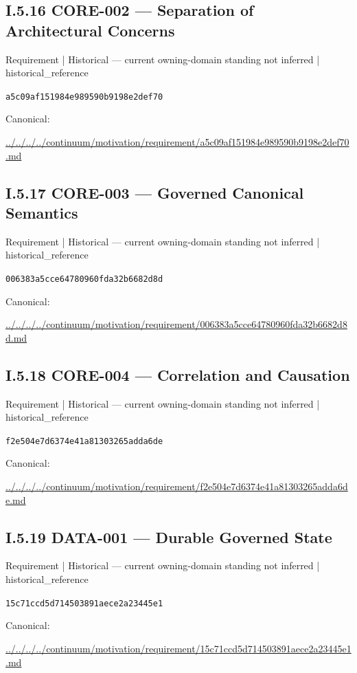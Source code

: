 \documentclass[10pt,a4paper]{article}
\begin{document}
\subsection*{I.5.16 CORE-002 — Separation of Architectural Concerns}
\label{element-a5c09af151984e989590b9198e2def70}
{\small Requirement | Historical — current owning-domain standing not inferred | historical\_reference}\par
\texttt{a5c09af151984e989590b9198e2def70}\par
Canonical: \par
{\footnotesize\url{../../../../continuum/motivation/requirement/a5c09af151984e989590b9198e2def70.md}}\par
\subsection*{I.5.17 CORE-003 — Governed Canonical Semantics}
\label{element-006383a5cce64780960fda32b6682d8d}
{\small Requirement | Historical — current owning-domain standing not inferred | historical\_reference}\par
\texttt{006383a5cce64780960fda32b6682d8d}\par
Canonical: \par
{\footnotesize\url{../../../../continuum/motivation/requirement/006383a5cce64780960fda32b6682d8d.md}}\par
\subsection*{I.5.18 CORE-004 — Correlation and Causation}
\label{element-f2e504e7d6374e41a81303265adda6de}
{\small Requirement | Historical — current owning-domain standing not inferred | historical\_reference}\par
\texttt{f2e504e7d6374e41a81303265adda6de}\par
Canonical: \par
{\footnotesize\url{../../../../continuum/motivation/requirement/f2e504e7d6374e41a81303265adda6de.md}}\par
\subsection*{I.5.19 DATA-001 — Durable Governed State}
\label{element-15c71ccd5d714503891aece2a23445e1}
{\small Requirement | Historical — current owning-domain standing not inferred | historical\_reference}\par
\texttt{15c71ccd5d714503891aece2a23445e1}\par
Canonical: \par
{\footnotesize\url{../../../../continuum/motivation/requirement/15c71ccd5d714503891aece2a23445e1.md}}\par
\end{document}
